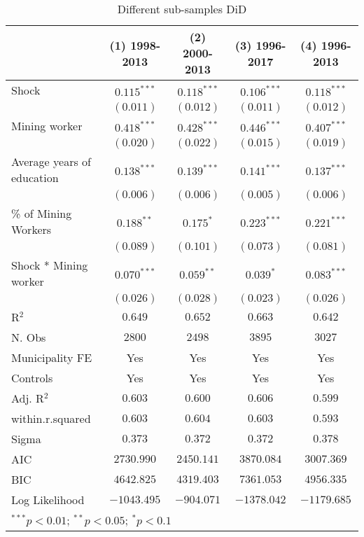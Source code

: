 
\begin{table}[H]
\caption{Different sub-samples DiD}
\begin{center}
\begin{tabular}{l c c c c}
\hline
 & (1) 1998-2013 & (2) 2000-2013 & (3) 1996-2017 & (4) 1996-2013 \\
\hline
Shock                      & $0.115^{***}$ & $0.118^{***}$ & $0.106^{***}$ & $0.118^{***}$ \\
                           & $(0.011)$     & $(0.012)$     & $(0.011)$     & $(0.012)$     \\
Mining worker              & $0.418^{***}$ & $0.428^{***}$ & $0.446^{***}$ & $0.407^{***}$ \\
                           & $(0.020)$     & $(0.022)$     & $(0.015)$     & $(0.019)$     \\
Average years of education & $0.138^{***}$ & $0.139^{***}$ & $0.141^{***}$ & $0.137^{***}$ \\
                           & $(0.006)$     & $(0.006)$     & $(0.005)$     & $(0.006)$     \\
\% of Mining Workers       & $0.188^{**}$  & $0.175^{*}$   & $0.223^{***}$ & $0.221^{***}$ \\
                           & $(0.089)$     & $(0.101)$     & $(0.073)$     & $(0.081)$     \\
Shock * Mining worker      & $0.070^{***}$ & $0.059^{**}$  & $0.039^{*}$   & $0.083^{***}$ \\
                           & $(0.026)$     & $(0.028)$     & $(0.023)$     & $(0.026)$     \\
\hline
R$^2$                      & $0.649$       & $0.652$       & $0.663$       & $0.642$       \\
N. Obs                     & $2800$        & $2498$        & $3895$        & $3027$        \\
Municipality FE            & Yes           & Yes           & Yes           & Yes           \\
Controls                   & Yes           & Yes           & Yes           & Yes           \\
Adj. R$^2$                 & $0.603$       & $0.600$       & $0.606$       & $0.599$       \\
within.r.squared           & $0.603$       & $0.604$       & $0.603$       & $0.593$       \\
Sigma                      & $0.373$       & $0.372$       & $0.372$       & $0.378$       \\
AIC                        & $2730.990$    & $2450.141$    & $3870.084$    & $3007.369$    \\
BIC                        & $4642.825$    & $4319.403$    & $7361.053$    & $4956.335$    \\
Log Likelihood             & $-1043.495$   & $-904.071$    & $-1378.042$   & $-1179.685$   \\
\hline
\multicolumn{5}{l}{\scriptsize{$^{***}p<0.01$; $^{**}p<0.05$; $^{*}p<0.1$}}
\end{tabular}
\label{table:coefficients}
\end{center}
\end{table}
